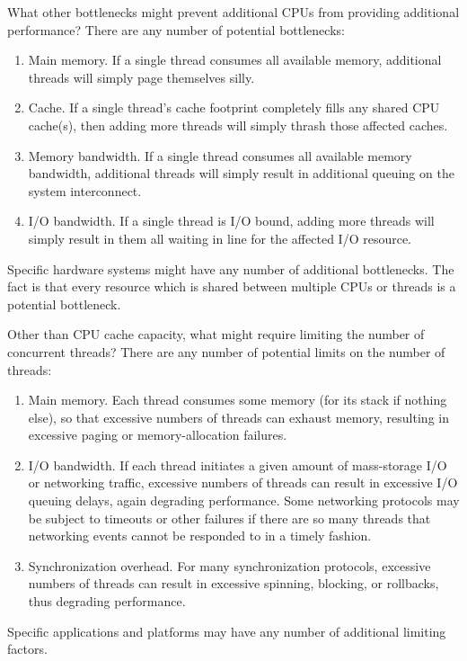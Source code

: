 \QuickQ{}
	What other bottlenecks might prevent additional CPUs from
	providing additional performance?
\QuickA{}
	There are any number of potential bottlenecks:
	\begin{enumerate}
	\item	Main memory.  If a single thread consumes all available
		memory, additional threads will simply page themselves
		silly.
	\item	Cache.  If a single thread's cache footprint completely
		fills any shared CPU cache(s), then adding more threads
		will simply thrash those affected caches.
	\item	Memory bandwidth.  If a single thread consumes all available
		memory bandwidth, additional threads will simply
		result in additional queuing on the system interconnect.
	\item	I/O bandwidth.  If a single thread is I/O bound,
		adding more threads will simply result in them all
		waiting in line for the affected I/O resource.
	\end{enumerate}

	Specific hardware systems might have any number of additional
	bottlenecks.
	The fact is that every resource which is shared between
	multiple CPUs or threads is a potential bottleneck.

\QuickQ{}
	Other than CPU cache capacity, what might require limiting the
	number of concurrent threads?
\QuickA{}
	There are any number of potential limits on the number of
	threads:
	\begin{enumerate}
	\item	Main memory.  Each thread consumes some memory
		(for its stack if nothing else), so that excessive
		numbers of threads can exhaust memory, resulting
		in excessive paging or memory-allocation failures.
	\item	I/O bandwidth.  If each thread initiates a given
		amount of mass-storage I/O or networking traffic,
		excessive numbers of threads can result in excessive
		I/O queuing delays, again degrading performance.
		Some networking protocols may be subject to timeouts
		or other failures if there are so many threads that
		networking events cannot be responded to in a timely
		fashion.
	\item	Synchronization overhead.
		For many synchronization protocols, excessive numbers
		of threads can result in excessive spinning, blocking,
		or rollbacks, thus degrading performance.
	\end{enumerate}

	Specific applications and platforms may have any number of additional
	limiting factors.


